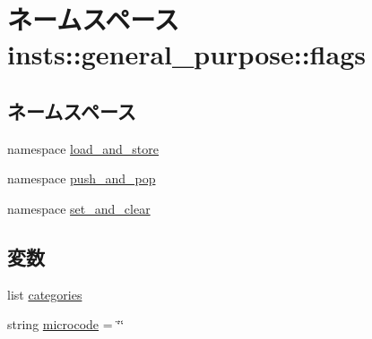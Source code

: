 \hypertarget{namespaceinsts_1_1general__purpose_1_1flags}{
\section{ネームスペース insts::general\_\-purpose::flags}
\label{namespaceinsts_1_1general__purpose_1_1flags}
}
\subsection*{ネームスペース}
\begin{DoxyCompactItemize}
\item 
namespace \hyperlink{namespaceinsts_1_1general__purpose_1_1flags_1_1load__and__store}{load\_\-and\_\-store}
\item 
namespace \hyperlink{namespaceinsts_1_1general__purpose_1_1flags_1_1push__and__pop}{push\_\-and\_\-pop}
\item 
namespace \hyperlink{namespaceinsts_1_1general__purpose_1_1flags_1_1set__and__clear}{set\_\-and\_\-clear}
\end{DoxyCompactItemize}
\subsection*{変数}
\begin{DoxyCompactItemize}
\item 
list \hyperlink{namespaceinsts_1_1general__purpose_1_1flags_a273cf0f1630af14c1582f05e53354a55}{categories}
\item 
string \hyperlink{namespaceinsts_1_1general__purpose_1_1flags_a770f11a173e99389a8802f0107ed8f52}{microcode} = \char`\"{}\char`\"{}
\end{DoxyCompactItemize}


